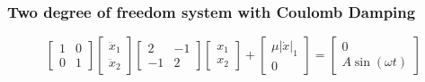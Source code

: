 \documentclass[11pt]{article}
\begin{document}
    \begin{center}
    \end{center}
    { \hspace*{\fill} \\}
    
    \subsubsection{Two degree of freedom system with Coulomb
Damping}\label{two-degree-of-freedom-system-with-coulomb-damping}

$$\begin{bmatrix}
1&0\\
0&1
\end{bmatrix}\begin{bmatrix}
\ddot{x}_1\\ \ddot{x}_2\end{bmatrix}
  \begin{bmatrix}
  2&-1 \\
  -1&2
  \end{bmatrix}\begin{bmatrix}
  {x}_1\\{x}_2\end{bmatrix}
  +
  \begin{bmatrix}
  \mu |\dot{x}|_{1}\\
  0
  \end{bmatrix}
=
  \begin{bmatrix}
  0 \\
  A \sin(\omega t)
  \end{bmatrix}
$$
\end{document}
